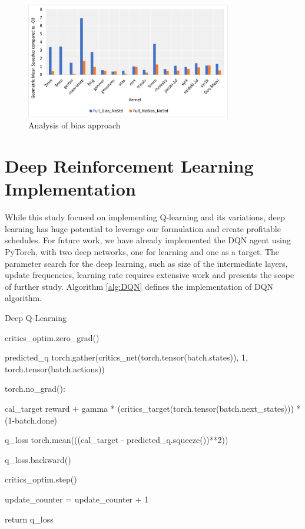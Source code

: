 \documentclass[logo,msc]{infthesis}           %
\begin{document}
\begin{figure}[htbp]
  \centering
  \includegraphics[width=0.8\textwidth]{Images/Compare_Bias.png}   
  \caption{Analysis of bias approach}
  \label{fig:Compare_Bias} 
\end{figure}

\chapter{Deep Reinforcement Learning Implementation}

While this study focused on implementing Q-learning and its variations, deep learning has huge potential to leverage our formulation and create profitable schedules. For future work, we have already implemented the DQN agent using PyTorch, with two deep networks, one for learning and one as a target. The parameter search for the deep learning, such as size of the intermediate layers, update frequencies, learning rate requires extensive work and presents the scope of further study. Algorithm \ref{alg:DQN} defines the implementation of DQN algorithm.

\begin{algorithm}[H]
\caption{Deep Q-Learning}\label{alg:DQN}

critics\_optim.zero\_grad()

predicted\_q \gets torch.gather(critics\_net(torch.tensor(batch.states)), 1, torch.tensor(batch.actions))

torch.no\_grad():

cal\_target \gets reward + gamma * (critics\_target(torch.tensor(batch.next\_states))) * (1-batch.done)
    
q\_loss \gets torch.mean(((cal\_target - predicted\_q.squeeze())**2))

q\_loss.backward()

critics\_optim.step()

update\_counter \gets = update\_counter + 1

    
return q\_loss
\end{algorithm}
\end{document}
